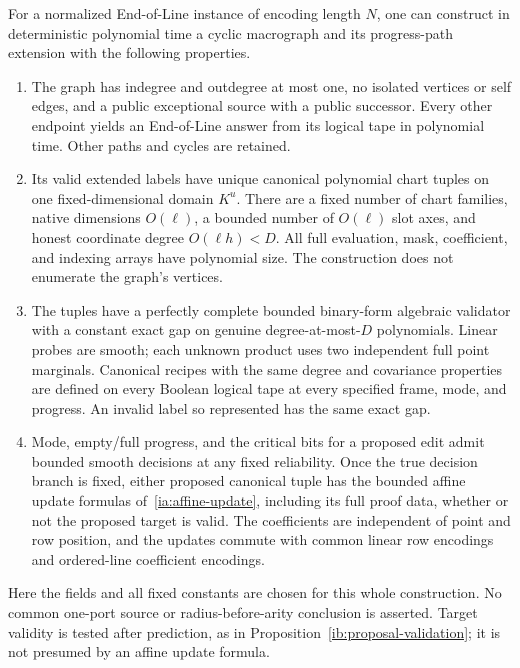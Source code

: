 \begin{proposition}
\label{ia:eol-algebra-interface}
For a normalized End-of-Line instance of encoding length \(N\), one
can construct in deterministic polynomial time a cyclic macrograph and
its progress-path extension with the following properties.
\begin{enumerate}[label=(\roman*)]
\item The graph has indegree and outdegree at most one, no isolated
vertices or self edges, and a public exceptional source with a public
successor. Every other endpoint yields an End-of-Line answer from
its logical tape in polynomial time. Other paths and cycles are
retained.
\item Its valid extended labels have unique canonical polynomial
chart tuples on one fixed-dimensional domain \(K^u\). There are a
fixed number of chart families, native dimensions \(O(\ell)\),
a bounded number of \(O(\ell)\) slot axes, and honest coordinate
degree \(O(\ell h)<D\). All full evaluation, mask, coefficient,
and indexing arrays have polynomial size. The construction does
not enumerate the graph's vertices.
\item The tuples have a perfectly complete bounded binary-form
algebraic validator with a constant exact gap on genuine
degree-at-most-\(D\) polynomials. Linear probes are smooth; each
unknown product uses two independent full point marginals. Canonical
recipes with the same degree and covariance properties are defined
on every Boolean logical tape at every specified frame, mode, and
progress. An invalid label so represented has the same exact gap.
\item Mode, empty/full progress, and the critical bits for a proposed
edit admit bounded smooth decisions at any fixed reliability. Once
the true decision branch is fixed, either proposed canonical tuple has the
bounded affine update formulas of~\eqref{ia:affine-update}, including
its full proof data, whether or not the proposed target is valid.
The coefficients are independent of point and row position, and
the updates commute with common linear row encodings and ordered-line
coefficient encodings.
\end{enumerate}
Here the fields and all fixed constants are chosen for this whole
construction. No common one-port source or radius-before-arity
conclusion is asserted. Target validity is tested after prediction,
as in Proposition~\ref{ib:proposal-validation}; it is not presumed
by an affine update formula.
\end{proposition}

